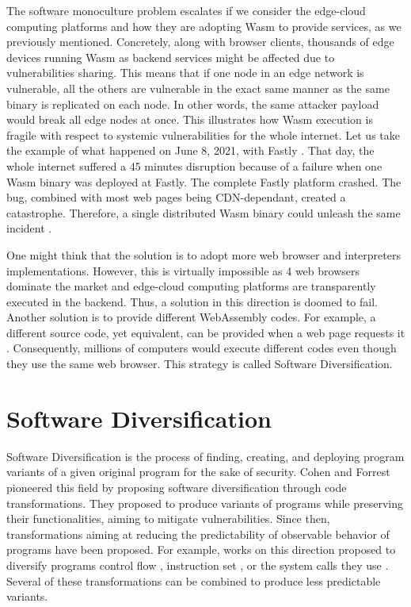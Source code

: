 {%
The software monoculture problem escalates if we consider the edge-cloud computing platforms and how they are adopting Wasm to provide services, as we previously mentioned.
Concretely, along with browser clients, thousands of edge devices running Wasm as backend services might be affected due to vulnerabilities sharing.
This means that if one node in an edge network is vulnerable, all the others are vulnerable in the exact same manner as the same binary is replicated on each node. In other words, the same attacker payload would break all edge nodes at once.
This illustrates how Wasm execution is fragile with respect to systemic vulnerabilities for the whole internet.
Let us take the example of what happened on June 8, 2021, with Fastly \cite{BREAKFastly}.
That day, the whole internet suffered a 45 minutes disruption because of a failure when one Wasm binary was deployed at Fastly.
The complete Fastly platform crashed.
The bug, combined with most web pages being CDN-dependant, created a catastrophe.
Therefore, a single distributed Wasm binary could unleash the same incident \cite{CVE}.

One might think that the solution is to adopt more web browser and interpreters implementations. 
However, this is virtually impossible as 4 web browsers dominate the market and edge-cloud computing platforms are transparently executed in the backend.
Thus, a solution in this direction is doomed to fail. 
Another solution is to provide different WebAssembly codes.
For example, a different source code, yet equivalent, can be provided when a web page requests it \cite{CROW}. 
Consequently, millions of computers would execute different codes even though they use the same web browser.
This strategy is called Software Diversification.
 
\section{Software Diversification}

Software Diversification is the process of finding, creating, and deploying program variants of a given original program \cite{okhravi2013survey} for the sake of security.
Cohen \etal \cite{cohen1993operating} and Forrest \etal \cite{595185} pioneered this field by proposing software diversification through code transformations. 
They proposed to produce variants of programs while preserving their functionalities, aiming to mitigate vulnerabilities.
Since then, transformations aiming at reducing the predictability of observable behavior of programs have been proposed. For example, works on this direction proposed to diversify programs control flow \cite{davi2015isomeron}, instruction set \cite{barrantes2003randomized}, or the system calls they use \cite{Chew02mitigatingbuffer}. 
Several of these transformations can be combined to produce less predictable variants.

}
